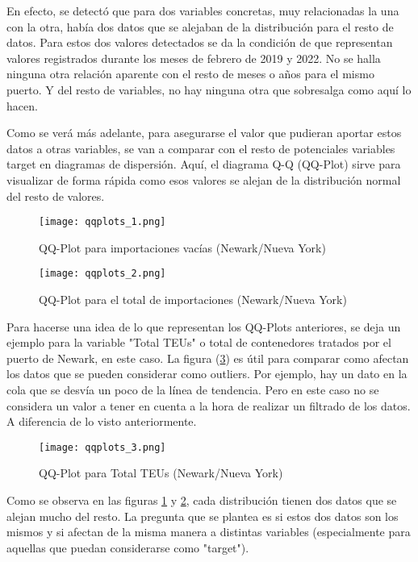 \documentclass[12pt]{article}
\begin{document}
		En efecto, se detectó que para dos variables concretas, muy relacionadas la una con la otra, había dos datos que se alejaban de la distribución para el resto de datos. Para estos dos valores detectados se da la condición de que representan valores registrados durante los meses de febrero de 2019 y 2022. No se halla ninguna otra relación aparente con el resto de meses o años para el mismo puerto. Y del resto de variables, no hay ninguna otra que sobresalga como aquí lo hacen.
		
		Como se verá más adelante, para asegurarse el valor que pudieran aportar estos datos a otras variables, se van a comparar con el resto de potenciales variables target en diagramas de dispersión. Aquí, el diagrama Q-Q (QQ-Plot) sirve para visualizar de forma rápida como esos valores se alejan de la distribución normal del resto de valores.
		
		\begin{figure}[H]
			\caption{\label{qqplots_1} QQ-Plot para importaciones vacías (Newark/Nueva York)}
			\centering
			\hspace*{1cm}
			\texttt{[image: qqplots\_1.png]}
		\end{figure}
	
		\begin{figure}[H]
			\caption{\label{qqplots_2} QQ-Plot para el total de importaciones (Newark/Nueva York)}
			\centering
			\hspace*{1cm}
			\texttt{[image: qqplots\_2.png]}
		\end{figure}
	
		Para hacerse una idea de lo que representan los QQ-Plots anteriores, se deja un ejemplo para la variable "Total TEUs" o total de contenedores tratados por el puerto de Newark, en este caso. La figura (\ref{qqplots_3}) es útil para comparar como afectan los datos que se pueden considerar como outliers. Por ejemplo, hay un dato en la cola que se desvía un poco de la línea de tendencia. Pero en este caso no se considera un valor a tener en cuenta a la hora de realizar un filtrado de los datos. A diferencia de lo visto anteriormente.
		
		\begin{figure}[H]
			\caption{\label{qqplots_3} QQ-Plot para Total TEUs (Newark/Nueva York)}
			\centering
			\hspace*{1cm}
			\texttt{[image: qqplots\_3.png]}
		\end{figure}
	
		Como se observa en las figuras \ref{qqplots_1} y \ref{qqplots_2}, cada distribución tienen dos datos que se alejan mucho del resto. La pregunta que se plantea es si estos dos datos son los mismos y si afectan de la misma manera a distintas variables (especialmente para aquellas que puedan considerarse como "target").
		
\end{document}
